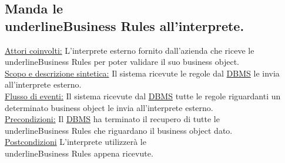 \subsection{Manda le \\underline{Business Rules} all'interprete.}
\underline{Attori coinvolti:} L'interprete esterno fornito dall'azienda che riceve le \\underline{Business Rules} per poter validare il suo business object.\\
\underline{Scopo e descrizione sintetica:} Il sistema ricevute le regole dal \underline{DBMS} le invia all'interprete esterno.\\
\underline{Flusso di eventi:} Il sistema ricevute dal \underline{DBMS} tutte le regole riguardanti un determinato business object le invia all'interprete esterno.\\
\underline{Precondizioni:} Il \underline{DBMS} ha terminato il recupero di tutte le \\underline{Business Rules} che riguardano il business object dato.\\
\underline{Postcondizioni} L'interprete utilizzer\`a le \\underline{Business Rules} appena ricevute.

